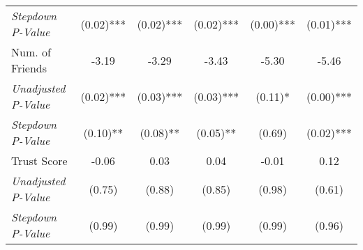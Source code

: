 \begin{tabular}{l c c c c c}
\quad \textit{Stepdown P-Value} & (0.02)*** & (0.02)*** & (0.02)*** & (0.00)*** & (0.01)*** \\
Num. of Friends & -3.19 & -3.29 & -3.43 & -5.30 & -5.46 \\
\quad \textit{Unadjusted P-Value} & (0.02)*** & (0.03)*** & (0.03)*** & (0.11)* & (0.00)*** \\
\quad \textit{Stepdown P-Value} & (0.10)** & (0.08)** & (0.05)** & (0.69) & (0.02)*** \\
Trust Score & -0.06 & 0.03 & 0.04 & -0.01 & 0.12 \\
\quad \textit{Unadjusted P-Value} & (0.75) & (0.88) & (0.85) & (0.98) & (0.61) \\
\quad \textit{Stepdown P-Value} & (0.99) & (0.99) & (0.99) & (0.99) & (0.96) \\
\bottomrule
\end{tabular}
